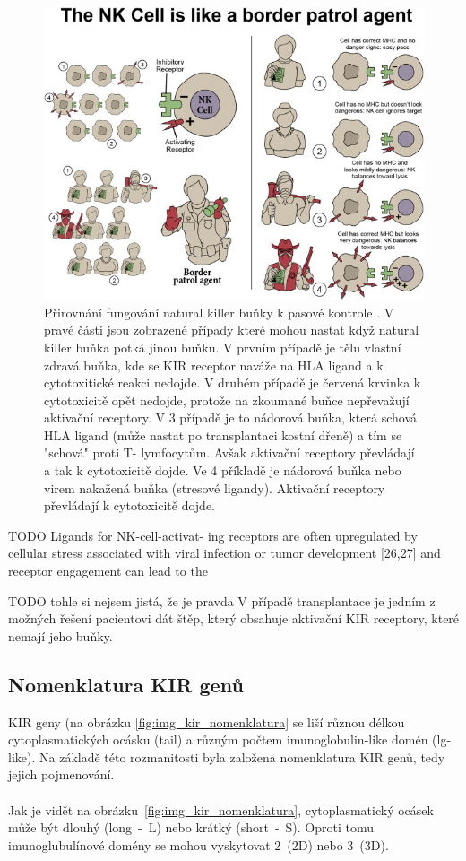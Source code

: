 \documentclass[czech,DP]{thesiskiv}
\begin{document}
\begin{figure}[H]		
		\centering
		\includegraphics[width=\textwidth]{./img/NK_princip.jpg}
		\caption{Přirovnání fungování natural killer buňky k pasové kontrole \cite{KIR_img_princip}. V pravé části jsou zobrazené případy které mohou nastat když natural killer buňka potká jinou buňku. V prvním případě je tělu vlastní zdravá buňka, kde se KIR receptor naváže na HLA ligand a k cytotoxitické reakci nedojde. V druhém případě je červená krvinka k cytotoxicitě opět nedojde, protože na zkoumané buňce nepřevažují aktivační receptory. V 3 případě je to nádorová buňka, která schová HLA ligand (může nastat po transplantaci kostní dřeně) a tím se "schová" proti T- lymfocytům. Avšak aktivační receptory převládají a tak k cytotoxicitě dojde. Ve 4 příkladě je nádorová buňka nebo virem nakažená buňka (stresové ligandy). Aktivační receptory převládají k cytotoxicitě dojde.}
		\label{fig:kir_princip}
\end{figure}

TODO Ligands for NK-cell-activat-
ing receptors are often upregulated by cellular stress
associated with viral infection or tumor development
[26,27] and receptor engagement can lead to the


TODO tohle si nejsem jistá, že je pravda V případě transplantace je jedním z možných řešení pacientovi dát štěp, který obsahuje aktivační KIR receptory, které nemají jeho buňky.

\subsection{Nomenklatura KIR genů}
KIR geny (na obrázku \ref{fig:img_kir_nomenklatura} se liší různou délkou cytoplasmatických ocásku (tail) a různým počtem imunoglobulin-like domén (lg-like). Na základě této rozmanitosti byla založena nomenklatura KIR genů, tedy jejich pojmenování. 
\\
\\
Jak je vidět na obrázku~\ref{fig:img_kir_nomenklatura}, cytoplasmatický ocásek může být dlouhý (long~-~L) nebo krátký (short~-~S). Oproti tomu imunoglubulínové domény se mohou vyskytovat 2~(2D) nebo 3~(3D). 
\end{document}
